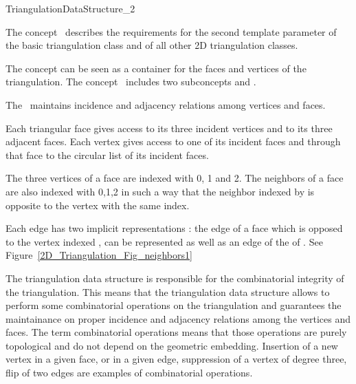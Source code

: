 
\begin{ccRefConcept}{TriangulationDataStructure_2}

\ccDefinition
  
The concept \ccRefName\ describes the requirements  for
the second template parameter of the basic triangulation class
 and of all other 2D triangulation classes.

The concept can be seen as a container for the 
faces and vertices of the triangulation.
The concept \ccRefName\  includes two subconcepts
 and
. 

The \ccRefName\ 
maintains incidence and adjacency relations
among vertices and faces.

Each triangular face gives access to its three incident vertices 
and to its three adjacent faces. 
Each vertex gives access to one of its incident faces
and through that face to the circular list of its incident faces.

The three vertices of a face are indexed with 0, 1 and 2.
The neighbors of a face are also 
indexed with 0,1,2 in such a way that the neighbor indexed by 
is opposite to the vertex with the same index.

Each edge has two implicit representations : the edge
of a face   which is opposed to the vertex indexed ,
can be represented as well as an edge of the \ccc{neighbor(i)} of 
\ccc{f}. See Figure~\ref{2D_Triangulation_Fig_neighbors1}


The triangulation data structure
 is responsible for  the combinatorial integrity of the triangulation.
This means that the triangulation data structure
allows to perform some combinatorial operations
on the triangulation and guarantees the maintainance on 
proper incidence and adjacency relations among the vertices
and faces. The term combinatorial operations
 means that those operations are purely topological
and do not depend on the geometric embedding.
Insertion of a new vertex in a given face, or in a given edge,
suppression of a vertex of degree three,  flip of two edges
are examples of combinatorial operations.




\end{ccRefConcept}
